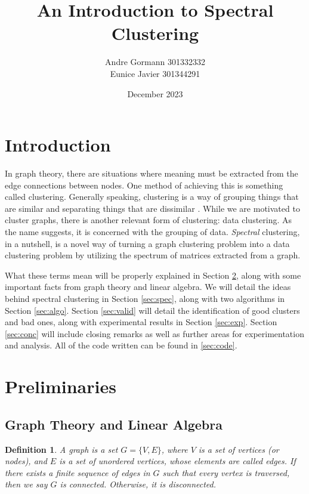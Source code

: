 \documentclass[11pt, letterpaper]{article}
\title{\vspace{-1.25cm}An Introduction to Spectral Clustering\vspace{-0.5cm}}
\author{Andre Gormann 301332332 \\Eunice Javier 301344291\vspace{-0.25cm}}
\date{December 2023}
\theoremstyle{perchance}
\newtheorem*{definition}{Definition}
\begin{document}
    \vspace{-10mm}

\maketitle
    
    \vspace{-15mm}
    
\section{Introduction}\label{sec:intro}

    In graph theory, there are situations where meaning must be extracted from the edge connections between nodes. One method of achieving this is something called clustering. Generally speaking, clustering is a way of grouping things that are similar and separating things that are dissimilar \cite{wikicluster}. While we are motivated to cluster graphs, there is another relevant form of clustering: data clustering. As the name suggests, it is concerned with the grouping of data. \emph{Spectral} clustering, in a nutshell, is a novel way of turning a graph clustering problem into a data clustering problem by utilizing the spectrum of matrices extracted from a graph.
    
    What these terms mean will be properly explained in Section \ref{sec:prelim}, along with some important facts from graph theory and linear algebra. We will detail the ideas behind spectral clustering in Section \ref{sec:spec}, along with two algorithms in Section \ref{sec:algo}. Section \ref{sec:valid} will detail the identification of good clusters and bad ones, along with experimental results in Section \ref{sec:exp}. Section \ref{sec:conc} will include closing remarks as well as further areas for experimentation and analysis. All of the code written can be found in \ref{sec:code}.
    
\section{Preliminaries}\label{sec:prelim}

    \subsection{Graph Theory and Linear Algebra}
    
        \begin{definition}
            A \emph{graph} is a set $G = \{V, E\}$, where $V$ is a set of vertices (or nodes), and $E$ is a set of unordered vertices, whose elements are called edges. If there exists a finite sequence of edges in $G$ such that every vertex is traversed, then we say $G$ is \emph{connected}. Otherwise, it is disconnected. 
        \end{definition}
    
\end{document}
